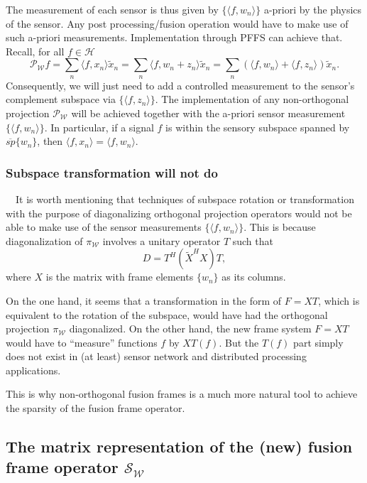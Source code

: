 \documentclass[11pt,reqno]{amsart}
\theoremstyle{remark}
\begin{document}
The measurement of each sensor is thus given by $\{{\langle} f, w_n{\rangle}\}$ a-priori by the physics of the sensor.   Any post processing/fusion operation would have to make use of such a-priori measurements.  Implementation through PFFS can achieve that.  Recall, for all $f\in\mathcal{H}$
\[
{{\mathcal P}}_{{\mathcal W}} f=\sum_n{\langle} f, x_n{\rangle} \tilde x_n = \sum_n{\langle} f, w_n + z_n{\rangle} \tilde x_n =\sum_n \left({\langle} f, w_n{\rangle} +{\langle} f, z_n{\rangle}\right)\tilde x_n.
\]
Consequently, we will just need to add a controlled measurement to the sensor's
complement subspace via $\{{\langle} f,z_n{\rangle}\}$.  The implementation of any non-orthogonal projection ${{\mathcal P}}_{{\mathcal W}}$ will be achieved together with the a-priori sensor measurement $\{{\langle} f, w_n{\rangle}\}$.   In particular, if a signal $f$ is within the sensory subspace spanned by ${\overline{sp}}\{w_n\}$, then ${\langle} f, x_n{\rangle} ={\langle} f, w_n{\rangle}$.

\subsubsection*{Subspace transformation will not do} \ \
It is worth mentioning that techniques of subspace rotation or transformation with the purpose of diagonalizing orthogonal projection operators would not be able to make use of the sensor measurements $\{{\langle} f, w_n{\rangle}\}$.  This is because diagonalization of $\pi_{{\mathcal W}}$ involves a unitary operator $T$ such that
\[
D = T^H\left({\tilde X}^H X\right) T,
\]
where $X$ is the matrix with frame elements $\{w_n\}$ as its columns.

On the one hand, it seems that a transformation in the form of $F =XT$, which is equivalent to the rotation of the subspace, would have had the orthogonal projection $\pi_{{\mathcal W}}$ diagonalized.   On the other hand, the new frame system $F=XT$ would have to ``measure'' functions $f$ by $XT(f)$.  But the $T(f)$ part simply does not exist  in (at least) sensor network and distributed processing applications.

This is why non-orthogonal fusion frames is a much more natural tool to achieve the sparsity of the fusion frame operator.

\subsection{The matrix representation of the (new) fusion frame operator ${{\mathcal S}_{{\mathcal W}}}$}
\end{document}
